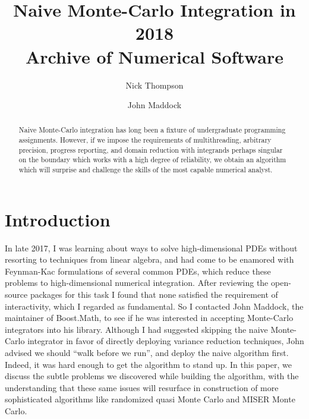 \documentclass{ansarticle}
\title{Naive Monte-Carlo Integration in 2018 \\
       Archive of Numerical Software}
\author[1]{Nick Thompson}
\affil[1]{bandgap.io}
\author[2]{John Maddock}
\affil[2]{The Boost Software Foundation}
\begin{document}
\maketitle

\begin{abstract}
Naive Monte-Carlo integration has long been a fixture of undergraduate programming assignments.
However, if we impose the requirements of multithreading, arbitrary precision, progress reporting, and domain reduction with integrands perhaps singular on the boundary which works with a high degree of reliability, we obtain an algorithm which will surprise and challenge the skills of the most capable numerical analyst.
\end{abstract}

\section{Introduction}

In late 2017, I was learning about ways to solve high-dimensional PDEs without resorting to techniques from linear algebra, and had come to be enamored with Feynman-Kac formulations of several common PDEs, which reduce these problems to high-dimensional numerical integration.
After reviewing the open-source packages for this task I found that none satisfied the requirement of interactivity, which I regarded as fundamental.
So I contacted John Maddock, the maintainer of Boost.Math, to see if he was interested in accepting Monte-Carlo integrators into his library.
Although I had suggested skipping the naive Monte-Carlo integrator in favor of directly deploying variance reduction techniques, John advised we should ``walk before we run'', and deploy the naive algorithm first.
Indeed, it was hard enough to get the algorithm to stand up.
In this paper, we discuss the subtle problems we discovered while building the algorithm, with the understanding that these same issues will resurface in construction of more sophisticated algorithms like randomized quasi Monte Carlo and MISER Monte Carlo.
\end{document}
